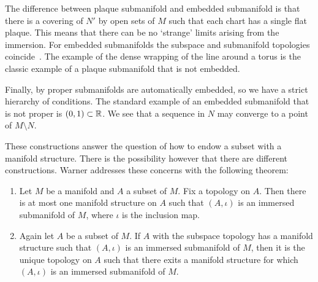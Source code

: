 The difference between plaque submanifold and embedded submanifold is that there is a covering of $N'$ by open sets of $M$ such that each chart has a single flat plaque.
This means that there can be no `strange' limits arising from the immersion.
For embedded submanifolds the subspace and submanifold topologies coincide~\cite[Prop~1.2.9]{Sharpe1997}.
The example of the dense wrapping of the line around a torus is the classic example of a plaque submanifold that is not embedded.

Finally, by \cite[Thm~1.2.11]{Sharpe1997} proper submanifolds are automatically embedded, so we have a strict hierarchy of conditions.
The standard example of an embedded submanifold that is not proper is $(0,1) \subset \mathbb{R}$.
We see that a sequence in $N$ may converge to a point of $M\setminus N$.

These constructions answer the question of how to endow a subset with a manifold structure.
There is the possibility however that there are different constructions.
Warner addresses these concerns with the following theorem: 
\begin{theorem}\label{thm:submanifolds}
\textup{\cite[Remark~1.33]{Warner1983}}
\begin{enumerate}
\item Let $M$ be a manifold and $A$ a subset of $M$. Fix a topology on $A$. Then there is at most one manifold structure on $A$ such that $(A,\iota)$ is an immersed submanifold of $M$, where $\iota$ is the inclusion map.
\item Again let $A$ be a subset of $M$. If $A$ with the subspace topology has a manifold structure such that $(A,\iota)$ is an immersed submanifold of $M$, then it is the unique topology on $A$ such that there exits a manifold structure for which $(A,\iota)$ is an immersed submanifold of $M$.
\end{enumerate}
\end{theorem}

